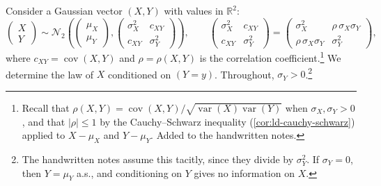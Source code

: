 Consider a Gaussian vector $(X,Y)$ with values in $\mathbb R^2$:
\begin{equation}\label{eq:gc-pair}
  \begin{pmatrix}X\\Y\end{pmatrix}\sim\mathcal N_2\left(\begin{pmatrix}\mu_X\\\mu_Y\end{pmatrix},
  \begin{pmatrix}\sigma_X^2&c_{XY}\\c_{XY}&\sigma_Y^2\end{pmatrix}\right),\qquad
  \begin{pmatrix}\sigma_X^2&c_{XY}\\c_{XY}&\sigma_Y^2\end{pmatrix}
  =\begin{pmatrix}\sigma_X^2&\rho\,\sigma_X\sigma_Y\\\rho\,\sigma_X\sigma_Y&\sigma_Y^2\end{pmatrix},
\end{equation}
where $c_{XY}=\operatorname{cov}(X,Y)$ and $\rho=\rho(X,Y)$ is the correlation
coefficient.\footnote{Recall that $\rho(X,Y)=\operatorname{cov}(X,Y)/\sqrt{\operatorname{var}(X)\operatorname{var}(Y)}$
when $\sigma_X,\sigma_Y>0$, and that $|\rho|\le1$ by the Cauchy--Schwarz inequality
(\cref{cor:ld-cauchy-schwarz}) applied to $X-\mu_X$ and $Y-\mu_Y$. Added to the handwritten notes.}
We determine the law of $X$ conditioned on $(Y=y)$. Throughout, $\sigma_Y>0$.\footnote{The handwritten
notes assume this tacitly, since they divide by $\sigma_Y^2$. If $\sigma_Y=0$, then $Y=\mu_Y$ a.s.,
and conditioning on $Y$ gives no information on $X$.}

